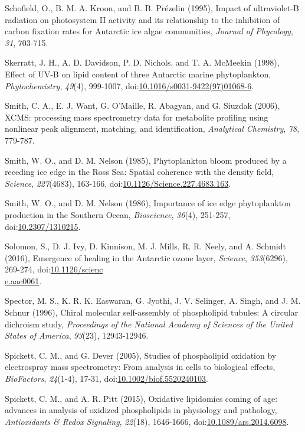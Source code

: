 \begin{singlespace}
{{Schofield, O., B. M. A. Kroon, and B. B. Pr\'{e}zelin (1995), Impact of ultraviolet-B radiation on photosystem II activity and its relationship to the inhibition of carbon fixation rates for Antarctic ice algae communities, \emph{Journal of Phycology}, \emph{31}, 703-715.

Skerratt, J. H., A. D. Davidson, P. D. Nichols, and T. A. McMeekin (1998), Effect of UV-B on lipid content of three Antarctic marine phytoplankton, \emph{Phytochemistry}, \emph{49}(4), 999-1007, doi:\href{http://dx.doi.org/10.1016/s0031-9422(97)01068-6}{10.1016/s0031-9422(97)01068-6}.

Smith, C. A., E. J. Want, G. O'Maille, R. Abagyan, and G. Siuzdak (2006), XCMS: processing mass spectrometry data for metabolite profiling using nonlinear peak alignment, matching, and identification, \emph{Analytical Chemistry}, \emph{78}, 779-787.

Smith, W. O., and D. M. Nelson (1985), Phytoplankton bloom produced by a receding ice edge in the Ross Sea: Spatial coherence with the density field, \emph{Science}, \emph{227}(4683), 163-166, doi:\href{http://dx.doi.org/10.1126/Science.227.4683.163}{10.1126/Science.227.4683.163}.

Smith, W. O., and D. M. Nelson (1986), Importance of ice edge phytoplankton production in the Southern Ocean, \emph{Bioscience}, \emph{36}(4), 251-257, doi:\href{http://dx.doi.org/10.2307/1310215}{10.2307/1310215}.

Solomon, S., D. J. Ivy, D. Kinnison, M. J. Mills, R. R. Neely, and A. Schmidt (2016), Emergence of healing in the Antarctic ozone layer, \emph{Science}, \emph{353}(6296), 269-274, doi:\href{http://dx.doi.org/10.1126/science.aae0061}{10.1126/scienc\\e.aae0061}.

Spector, M. S., K. R. K. Easwaran, G. Jyothi, J. V. Selinger, A. Singh, and J. M. Schnur (1996), Chiral molecular self-assembly of phospholipid tubules: A circular dichroism study, \emph{Proceedings of the National Academy of Sciences of the United States of America}, \emph{93}(23), 12943-12946.

Spickett, C. M., and G. Dever (2005), Studies of phospholipid oxidation by electrospray mass spectrometry: From analysis in cells to biological effects, \emph{BioFactors}, \emph{24}(1-4), 17-31, doi:\href{http://dx.doi.org/10.1002/biof.5520240103}{10.1002/biof.5520240103}.

Spickett, C. M., and A. R. Pitt (2015), Oxidative lipidomics coming of age: advances in analysis of oxidized phospholipids in physiology and pathology, \emph{Antioxidants \& Redox Signaling}, \emph{22}(18), 1646-1666, doi:\href{http://dx.doi.org/10.1089/ars.2014.6098}{10.1089/ars.2014.6098}.

}}
\end{singlespace}
